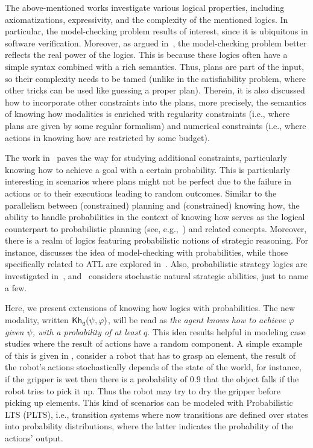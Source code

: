 The above-mentioned works investigate various logical properties, including axiomatizations, expressivity, and the complexity of the mentioned logics. In particular, the model-checking problem results of interest, since it is  ubiquitous in software verification. Moreover, as argued in~\cite{DemriF23}, the model-checking problem better reflects the real power of the logics. This is because these logics often have a simple syntax combined with a rich semantics. Thus, plans are part of the input, so their complexity needs to be tamed (unlike in the satisfiability problem, where other tricks can be used like guessing a proper plan). Therein, it is also discussed how to incorporate other constraints into the plans, more precisely, the semantics of knowing how modalities is enriched with regularity constraints (i.e., where plans are given by some regular formalism) and numerical constraints (i.e., where actions in knowing how are restricted by some budget). 

The work in \cite{DemriF23}~paves the way for studying additional constraints, particularly knowing how to achieve a goal with a certain probability. This is particularly interesting in scenarios where plans might not be perfect due to the 
failure in actions or to their executions leading to random outcomes. Similar to the parallelism between (constrained) planning and (constrained) knowing how, the ability to handle probabilities in the context of knowing how serves as the logical counterpart to probabilistic planning (see, e.g.,~\cite{MadaniHC99}) and related concepts. Moreover, there is a realm of logics featuring probabilistic notions of strategic reasoning. For instance, \cite{BaierAFK18} discusses the idea of model-checking with probabilities, while those specifically related to ATL are explored in~\cite{BA95,TJ07,BullingJ09}. Also, probabilistic strategy logics are investigated in~\cite{AKMM19}, and~\cite{BerthonKMM24} considers stochastic natural strategic abilities, just to name a few.

Here, we present extensions of knowing how logics with probabilities. The new modality, written ${\mathsf{Kh}}_q(\psi,\varphi)$, will be read as \emph{the agent knows how to achieve $\varphi$ given $\psi$, with a probability of at least $q$}. This idea results helpful in modeling case studies where the result of actions have a random component. A simple example of this is given in \cite{Kushmerick1995},  consider a robot that has to grasp an element,  the result of the robot's actions stochastically depends of the state of the world, for instance,  if the gripper is wet then there is  a probability of $0.9$ that the object falls if the robot tries to pick it up.  Thus the robot may try to dry the gripper before picking up elements.   This kind of scenarios can be modeled with Probabilistic LTS (PLTS), i.e., transition systems where now transitions are defined over states into probability distributions, where the latter indicates the probability of the actions' output. 

